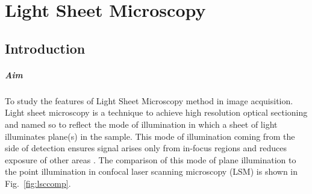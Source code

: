 
\chapter{Light Sheet Microscopy}
\label{chp:Lightsheet}

\section{Introduction}

\paragraph{Aim} To study the features of Light Sheet Microscopy method in image acquisition.
\\

Light sheet microscopy is a technique to achieve high resolution optical sectioning and named so to reflect the mode of illumination in which a sheet of light illuminates plane(s) in the sample. 
This mode of illumination coming from the side of detection ensures signal arises only from in-focus regions and reduces exposure of other areas \cite{Power2017}. 
The comparison of this mode of plane illumination to the point illumination in confocal laser scanning microscopy (LSM) is shown in Fig.~\ref{fig:lsccomp}. 

